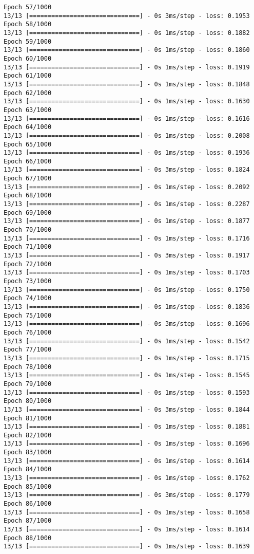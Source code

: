 \documentclass[11pt]{article}
\begin{document}
\begin{Verbatim}[commandchars=\\\{\}]
Epoch 57/1000
13/13 [==============================] - 0s 3ms/step - loss: 0.1953
Epoch 58/1000
13/13 [==============================] - 0s 1ms/step - loss: 0.1882
Epoch 59/1000
13/13 [==============================] - 0s 1ms/step - loss: 0.1860
Epoch 60/1000
13/13 [==============================] - 0s 1ms/step - loss: 0.1919
Epoch 61/1000
13/13 [==============================] - 0s 1ms/step - loss: 0.1848
Epoch 62/1000
13/13 [==============================] - 0s 1ms/step - loss: 0.1630
Epoch 63/1000
13/13 [==============================] - 0s 1ms/step - loss: 0.1616
Epoch 64/1000
13/13 [==============================] - 0s 1ms/step - loss: 0.2008
Epoch 65/1000
13/13 [==============================] - 0s 1ms/step - loss: 0.1936
Epoch 66/1000
13/13 [==============================] - 0s 3ms/step - loss: 0.1824
Epoch 67/1000
13/13 [==============================] - 0s 1ms/step - loss: 0.2092
Epoch 68/1000
13/13 [==============================] - 0s 1ms/step - loss: 0.2287
Epoch 69/1000
13/13 [==============================] - 0s 1ms/step - loss: 0.1877
Epoch 70/1000
13/13 [==============================] - 0s 1ms/step - loss: 0.1716
Epoch 71/1000
13/13 [==============================] - 0s 3ms/step - loss: 0.1917
Epoch 72/1000
13/13 [==============================] - 0s 1ms/step - loss: 0.1703
Epoch 73/1000
13/13 [==============================] - 0s 1ms/step - loss: 0.1750
Epoch 74/1000
13/13 [==============================] - 0s 1ms/step - loss: 0.1836
Epoch 75/1000
13/13 [==============================] - 0s 3ms/step - loss: 0.1696
Epoch 76/1000
13/13 [==============================] - 0s 1ms/step - loss: 0.1542
Epoch 77/1000
13/13 [==============================] - 0s 1ms/step - loss: 0.1715
Epoch 78/1000
13/13 [==============================] - 0s 1ms/step - loss: 0.1545
Epoch 79/1000
13/13 [==============================] - 0s 1ms/step - loss: 0.1593
Epoch 80/1000
13/13 [==============================] - 0s 3ms/step - loss: 0.1844
Epoch 81/1000
13/13 [==============================] - 0s 1ms/step - loss: 0.1881
Epoch 82/1000
13/13 [==============================] - 0s 1ms/step - loss: 0.1696
Epoch 83/1000
13/13 [==============================] - 0s 1ms/step - loss: 0.1614
Epoch 84/1000
13/13 [==============================] - 0s 1ms/step - loss: 0.1762
Epoch 85/1000
13/13 [==============================] - 0s 3ms/step - loss: 0.1779
Epoch 86/1000
13/13 [==============================] - 0s 1ms/step - loss: 0.1658
Epoch 87/1000
13/13 [==============================] - 0s 1ms/step - loss: 0.1614
Epoch 88/1000
13/13 [==============================] - 0s 1ms/step - loss: 0.1639

\end{Verbatim}
\end{document}

